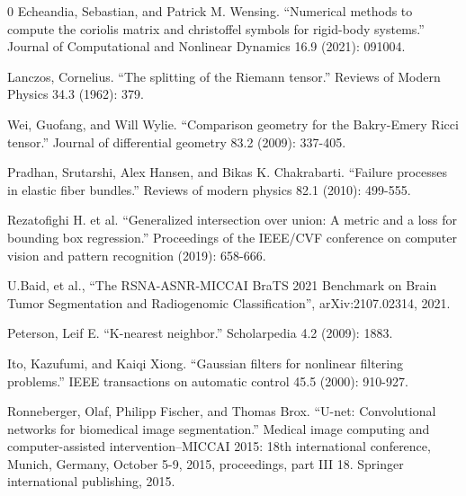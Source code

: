 \documentclass[a4paper,12pt]{extarticle}
\begin{document}
\begin{thebibliography}{0}
\hypertarget{2}{}
Echeandia, Sebastian, and Patrick M. Wensing. ``Numerical methods to compute the coriolis matrix and christoffel symbols for rigid-body systems.'' Journal of Computational and Nonlinear Dynamics 16.9 (2021): 091004.

\hypertarget{2}{}
Lanczos, Cornelius. ``The splitting of the Riemann tensor.'' Reviews of Modern Physics 34.3 (1962): 379.

\hypertarget{2}{}
Wei, Guofang, and Will Wylie. ``Comparison geometry for the Bakry-Emery Ricci tensor.'' Journal of differential geometry 83.2 (2009): 337-405.

\hypertarget{2}{}
Pradhan, Srutarshi, Alex Hansen, and Bikas K. Chakrabarti. ``Failure processes in elastic fiber bundles.'' Reviews of modern physics 82.1 (2010): 499-555.

\hypertarget{2}{}
Rezatofighi H. et al. ``Generalized intersection over union: A metric and a loss for bounding box regression.'' Proceedings of the IEEE/CVF conference on computer vision and pattern recognition (2019): 658-666.

\hypertarget{2}{}
U.Baid, et al., ``The RSNA-ASNR-MICCAI BraTS 2021 Benchmark on Brain Tumor Segmentation and Radiogenomic Classification'', arXiv:2107.02314, 2021.

\hypertarget{2}{}
Peterson, Leif E. ``K-nearest neighbor.'' Scholarpedia 4.2 (2009): 1883.

\hypertarget{2}{}
Ito, Kazufumi, and Kaiqi Xiong. ``Gaussian filters for nonlinear filtering problems.'' IEEE transactions on automatic control 45.5 (2000): 910-927.

\hypertarget{2}{}
Ronneberger, Olaf, Philipp Fischer, and Thomas Brox. ``U-net: Convolutional networks for biomedical image segmentation.'' Medical image computing and computer-assisted intervention–MICCAI 2015: 18th international conference, Munich, Germany, October 5-9, 2015, proceedings, part III 18. Springer international publishing, 2015.

\end{thebibliography}
\end{document}
